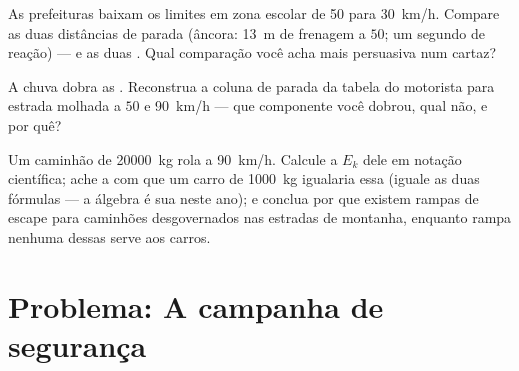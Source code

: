 \begin{exercise}[$\star\star$]\label{exo:g9:kinetic-energy-safety:10}
As prefeituras baixam os limites em zona escolar de \qty{50}{} para
\qty{30}{km/h}. Compare as duas distâncias de parada (âncora:
\qty{13}{m} de frenagem a $50$; um segundo de reação) --- e as duas
. Qual comparação você acha mais persuasiva num
cartaz?
\end{exercise}

\begin{exercise}[$\star\star$]\label{exo:g9:kinetic-energy-safety:11}
A chuva dobra as . Reconstrua a coluna de
parada da tabela do motorista para estrada molhada a $50$ e
\qty{90}{km/h} --- que componente você dobrou, qual não, e por quê?
\end{exercise}

\begin{exercise}[$\star\star\star$]\label{exo:g9:kinetic-energy-safety:12}
Um caminhão de \qty{20000}{kg} rola a \qty{90}{km/h}. Calcule a $E_k$
dele em notação científica; ache a  com que um carro de
\qty{1000}{kg} igualaria essa  (iguale as duas fórmulas --- a
álgebra é sua neste ano); e conclua por que existem rampas de escape
para caminhões desgovernados nas estradas de montanha, enquanto rampa
nenhuma dessas serve aos carros.
\end{exercise}

\section{Problema: A campanha de segurança}


